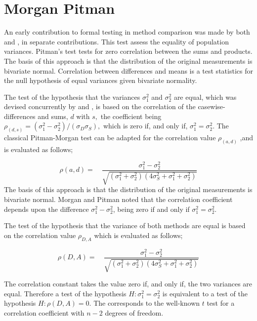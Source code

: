 \documentclass[12pt, a4paper]{report}
\theoremstyle{plain}
\theoremstyle{definition}
\theoremstyle{remark}
\begin{document}


\section{Morgan Pitman}


An early contribution to formal testing in method comparison was
made by both \citet{Morgan} and \citet{Pitman}, in separate
contributions. This test assess the equality
of population variances. Pitman's test tests for zero correlation
between the sums and products. The basis of this approach is that the
distribution of the original measurements is bivariate normal.
Correlation between differences and means is a test statistics for
the null hypothesis of equal variances given bivariate normality.


The test of the hypothesis that the variances $\sigma^2_1$ and $\sigma^2_2$ are equal, which was devised concurrently by \citet{Pitman} and \citet{Morgan}, 
is based on the correlation of the casewise-differences and sums, $d$ with $s,$ the coefficient being $ \rho_{(d,s)} = (\sigma^2_1 -\sigma^2_2) / ( \sigma_D \sigma_S ),$ which is zero if, and only
if, $\sigma^2_1 = \sigma^2_2.$ The classical Pitman-Morgan test can be adapted for the correlation value $\rho_{(a,d)}$ ,and
is evaluated as follows;

\begin{equation}
\rho(a,d)=\quad\frac{\sigma^{2}_{1}-\sigma^{2}_{2}}{\sqrt{(\sigma^{2}_{1}+\sigma^{2}_{2})(4\sigma^{2}_{S}+\sigma^{2}_{1}+\sigma^{2}_{2})}}
\end{equation}
The basis of this approach is that the
distribution of the original measurements is bivariate normal.
Morgan and Pitman noted that the correlation coefficient depends
upon the difference $\sigma^{2}_{1}- \sigma^{2}_{2}$, being zero
if and only if $\sigma^{2}_{1}=\sigma^{2}_{2}$.

The test of the hypothesis that the variance of both methods are
equal is based on the correlation value $\rho_{D,A}$ which is
evaluated as follows;

\begin{equation}
\rho(D,A)=\quad\frac{\sigma^{2}_{1}-\sigma^{2}_{2}}{\sqrt{(\sigma^{2}_{1}+\sigma^{2}_{2})(4\sigma^{2}_{S}+\sigma^{2}_{1}+\sigma^{2}_{2})}}
\end{equation}

The correlation constant takes the value zero if, and only if, the
two variances are equal. Therefore a test of the hypothesis $H:
\sigma^{2}_{1}=\sigma^{2}_{2}$ is equivalent to a test of the
hypothesis $H: \rho(D,A) = 0$. The corresponds to the well-known
$t$ test for a correlation coefficient with $n-2$ degrees of
freedom.
\end{document}
